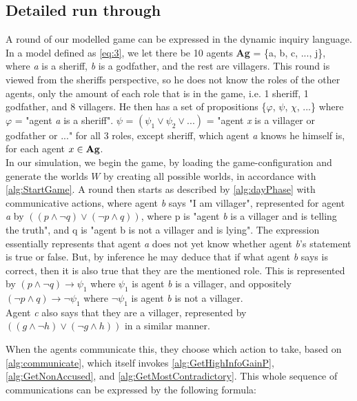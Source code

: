 \subsection{Detailed run through}\label{sec:ARoundOfTheGame}
A round of our modelled game can be expressed in the dynamic inquiry language.
In a model defined as \cref{eq:3}, we let there be 10 agents \textbf{Ag} = \{a,
b, c, ..., j\}, where \textit{a} is a sheriff, \textit{b} is a godfather, and
the rest are villagers. This round is viewed from the sheriffs perspective, so
he does not know the roles of the other agents, only the amount of each role
that is in the game, i.e. 1 sheriff, 1 godfather, and 8 villagers. He then has
a set of propositions \{$\varphi$, $\psi$, $\chi$, $...$\} where $\varphi$ =
"agent \textit{a} is a sheriff". $\psi$ = $(\psi_1 \lor \psi_2 \lor ... )$ =
"agent \textit{x} is a villager or godfather or ..." for all 3 roles, except
sheriff, which agent \textit{a} knows he himself is, for each agent $x \in
	\text{\textbf{Ag}}$. \\ In our simulation, we begin the game, by loading the
game-configuration and generate the worlds $W$ by creating all possible worlds,
in accordance with \cref{alg:StartGame}. A round then starts as described by
\cref{alg:dayPhase} with communicative actions, where agent \textit{b} says "I
am villager", represented for agent \textit{a} by $((p \land \neg q) \lor (\neg
	p \land q))$, where p is "agent \textit{b} is a villager and is telling the
truth", and q is "agent b is not a villager and is lying". The expression
essentially represents that agent \textit{a} does not yet know whether agent
\textit{b}'s statement is true or false. But, by inference he may deduce that
if what agent \textit{b} says is correct, then it is also true that they are
the mentioned role. This is represented by $(p \land \neg q) \rightarrow
	\psi_1$ where $\psi_1$ is agent \textit{b} is a villager, and oppositely $(\neg
	p \land q) \rightarrow \neg \psi_1$ where $\neg \psi_1$ is agent \textit{b} is
not a villager. \\ Agent \textit{c} also says that they are a villager,
represented by $((g \land \neg h) \lor (\neg g \land h))$ in a similar manner.

When the agents communicate this, they choose which action to take, based on
\cref{alg:communicate}, which itself invokes \cref{alg:GetHighInfoGainP},
\cref{alg:GetNonAccused}, and \cref{alg:GetMostContradictory}. This whole
sequence of communications can be expressed by the following formula:

